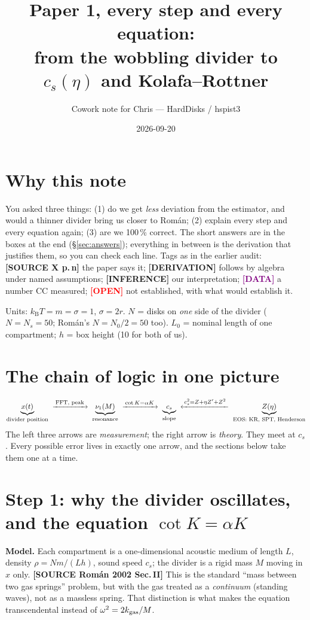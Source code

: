 \documentclass[11pt,a4paper]{article}
\title{Paper 1, every step and every equation:\\ from the wobbling divider to $c_s(\eta)$ and Kolafa--Rottner}
\author{Cowork note for Chris --- HardDisks / hspist3}
\date{2026-09-20}
\newcommand{\kT}{k_{\mathrm B}T}
\newcommand{\src}[1]{\textcolor{OliveGreen}{\textbf{[SOURCE #1]}}}
\newcommand{\der}{\textcolor{NavyBlue}{\textbf{[DERIVATION]}}}
\newcommand{\infr}{\textcolor{BurntOrange}{\textbf{[INFERENCE]}}}
\newcommand{\dat}{\textcolor{Purple}{\textbf{[DATA]}}}
\newcommand{\opn}{\textcolor{Red}{\textbf{[OPEN]}}}
\begin{document}
\maketitle

\section*{Why this note}
You asked three things: (1) do we get \emph{less} deviation from the estimator, and would a thinner divider bring us closer to Rom\'an; (2) explain every step and every equation again; (3) are we 100\,\% correct. The short answers are in the boxes at the end (\S\ref{sec:answers}); everything in between is the derivation that justifies them, so you can check each line. Tags as in the earlier audit: \src{X p.\,n} the paper says it; \der{} follows by algebra under named assumptions; \infr{} our interpretation; \dat{} a number CC measured; \opn{} not established, with what would establish it.

Units: $\kT = m = \sigma = 1$, $\sigma = 2r$. $N$ = disks on \emph{one} side of the divider ($N = N_s = 50$; Rom\'an's $N = N_0/2 = 50$ too). $L_0$ = nominal length of one compartment; $h$ = box height (10 for both of us).

\section{The chain of logic in one picture}
\[
\small
\underbrace{x(t)}_{\text{divider position}}
\;\xrightarrow{\ \text{FFT, peak}\ }\;
\underbrace{\nu_1(M)}_{\text{resonance}}
\;\xrightarrow{\ \cot K = \alpha K\ }\;
\underbrace{c_s}_{\text{slope}}
\;\xleftarrow{\ c_s^2 = Z+\eta Z'+Z^2\ }\;
\underbrace{Z(\eta)}_{\text{EOS: KR, SPT, Henderson}}
\]
The left three arrows are \emph{measurement}; the right arrow is \emph{theory}. They meet at $c_s$. Every possible error lives in exactly one arrow, and the sections below take them one at a time.

\section{Step 1: why the divider oscillates, and the equation $\cot K = \alpha K$}
\label{sec:cotK}
\textbf{Model.} Each compartment is a one-dimensional acoustic medium of length $L$, density $\rho = Nm/(Lh)$, sound speed $c_s$; the divider is a rigid mass $M$ moving in $x$ only. \src{Rom\'an 2002 Sec.\,II} This is the standard ``mass between two gas springs'' problem, but with the gas treated as a \emph{continuum} (standing waves), not as a massless spring. That distinction is what makes the equation transcendental instead of $\omega^2 = 2k_{\rm gas}/M$.
\end{document}
